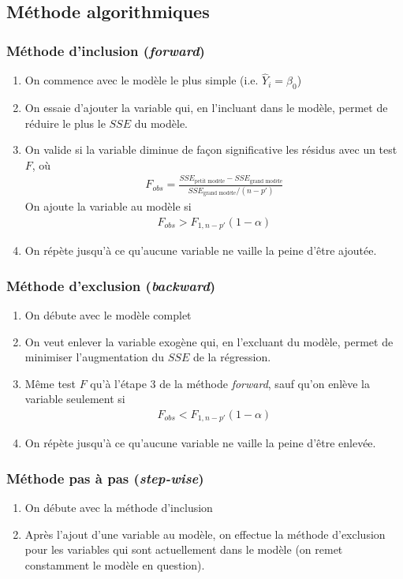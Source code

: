 \documentclass[10pt, french]{article}
\begin{document}
\begin{multicols*}{3}
\subsection*{Méthode algorithmiques}

\subsubsection*{Méthode d'inclusion (\textit{forward})}
\begin{enumerate}
\item On commence avec le modèle le plus simple (i.e. $\hat{Y}_i = \beta_0$)
\item On essaie d'ajouter la variable qui, en l'incluant dans le modèle, permet de réduire le plus le $SSE$ du modèle.
\item On valide si la variable diminue de façon significative les résidus avec un test $F$, où
\begin{align*}
F_{obs} = \frac{SSE_{\text{petit modèle}} - SSE_{\text{grand modèle}}}{SSE_{\text{grand modèle}} / (n-p')}
\end{align*}
On ajoute la variable au modèle si
\begin{align*}
F_{obs} > F_{1, n-p'}(1 - \alpha)
\end{align*}
\item On répète jusqu'à ce qu'aucune variable ne vaille la peine d'être ajoutée.
\end{enumerate}


\subsubsection*{Méthode d'exclusion (\textit{backward})}
\begin{enumerate}
\item On débute avec le modèle complet
\item On veut enlever la variable exogène qui, en l'excluant du modèle, permet de minimiser l'augmentation du $SSE$ de la régression.
\item Même test $F$ qu'à l'étape 3 de la méthode \textit{forward}, sauf qu'on enlève la variable seulement si
\begin{align*}
F_{obs} < F_{1, n-p'}(1-\alpha)
\end{align*}
\item On répète jusqu'à ce qu'aucune variable ne vaille la peine d'être enlevée.
\end{enumerate}


\subsubsection*{Méthode pas à pas (\textit{step-wise})}
\begin{enumerate}
\item On débute avec la méthode d'inclusion
\item Après l'ajout d'une variable au modèle, on effectue la méthode d'exclusion pour les variables qui sont actuellement dans le modèle (on remet constamment le modèle en question).
\end{enumerate}



\end{multicols*}
\end{document}
